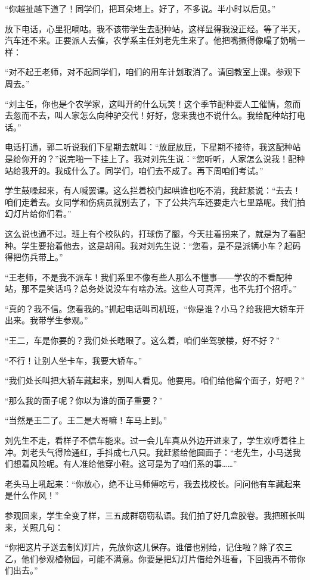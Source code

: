  “你越扯越下道了！同学们，把耳朵堵上。好了，不多说。半小时以后见。” 
 
 放下电话，心里犯嘀咕。我不该带学生去配种站，这样显得我没正经。等了半天，汽车还不来。正要派人去催，农学系主任刘老先生来了。他把嘴撅得像嘬了奶嘴一样： 
 
 “对不起王老师，对不起同学们，咱们的用车计划取消了。请回教室上课。参观下周去。” 
 
 “刘主任，你也是个农学家，这叫开的什么玩笑！这个季节配种要人工催情，忽而去忽而不去，叫人家怎么向种驴交代！好好，您来我也不说什么。我给配种站打电话。” 
 
 电话打通，郭二听说我们下星期去就叫：“放屁放屁，下星期不接待，我这配种站是给你开的？”说完啪一下挂上了。我对刘先生说：“您听听，人家怎么说我！配种站给我开的。我成什么了。同学们，咱们去不成了。再下周咱们考试。” 
 
 学生鼓噪起来，有人喊罢课。这么拦着校门起哄谁也吃不消，我赶紧说：“去去！咱们走着去。女同学和伤病员就别去了，下了公共汽车还要走六七里路呢。我们拍幻灯片给你们看。” 
 
 这么说也通不过。班上有个校队的，打球伤了腿，今天拄着拐来了，就是为了看配种。学生要抬着他去，这是胡闹。我对刘先生说：“您看，是不是派辆小车？起码得把伤兵带上。” 
 
 “王老师，不是我不派车！我们系里不像有些人那么不懂事——学农的不看配种站，那不是笑话吗？总务处说没车有啥办法。这些人可真浑，也不先打个招呼。” 
 
 “真的？我不信。您看我的。”抓起电话叫司机班，“你是谁？小马？给我把大轿车开出来。我带学生参观。” 
 
 “王二，车是你要的？我们处长瞎眼了。这么着，咱们坐驾驶楼，好不好？” 
 
 “不行！让别人坐卡车，我要大轿车。” 
 
 “我们处长叫把大轿车藏起来，别叫人看见。他要用。咱们给他留个面子，好吧？” 
 
 “那么我的面子呢？你以为谁的面子重要？” 
 
 “当然是王二了。王二是大哥嘛！车马上到。” 
 
 刘先生不走，看样子不信车能来。过一会儿车真从外边开进来了，学生欢呼着往上冲。刘老头气得险通红，手抖成七八只。我赶紧给他圆面子：“老先生，小马送我们想着风险呢。有人准给他穿小鞋。这可是为了咱们系的事……” 
 
 老头马上吼起来：“你放心，绝不让马师傅吃亏，我去找校长。问问他有车藏起来是什么作风！” 
 
 参观回来，学生全变了样，三五成群窃窃私语。我们拍了好几盒胶卷。我把班长叫来，关照几句： 
 
 “你把这片子送去制幻灯片，先放你这儿保存。谁借也别给，记住啦？除了农三乙，他们参观植物园，可能不满意。你要是把幻灯片借给外班看，下回我再不带你们出去。” 
 
